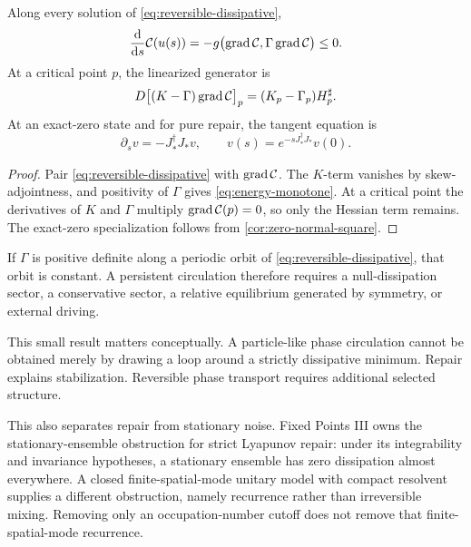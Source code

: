\documentclass[11pt,a4paper]{article}
\begin{document}
\begin{theorem}
\label{thm:repair-flow}
Along every solution of \eqref{eq:reversible-dissipative},
\begin{equation}
\frac{\mathrm{d}}{\mathrm{d} s}\mathcal{C}(u(s))
=-g\bigl(\operatorname{grad}\mathcal{C},\Gamma\operatorname{grad}\mathcal{C}\bigr)\leq0.
\label{eq:energy-monotone}
\end{equation}
At a critical point \(p\), the linearized generator is
\begin{equation}
D\bigl[(K-\Gamma)\operatorname{grad}\mathcal{C}\bigr]_p
=(K_p-\Gamma_p)H_p^{\sharp}.
\label{eq:linearized-general}
\end{equation}
At an exact-zero state and for pure repair, the tangent equation is
\begin{equation}
\partial_s v=-J_*^{\dagger}J_*v,
\qquad
v(s)=e^{-sJ_*^{\dagger}J_*}v(0).
\label{eq:tangent-heat}
\end{equation}
\end{theorem}

\begin{proof}
Pair \eqref{eq:reversible-dissipative} with \(\operatorname{grad}\mathcal{C}\).  The
\(K\)-term vanishes by skew-adjointness, and positivity of \(\Gamma\)
gives \eqref{eq:energy-monotone}.  At a critical point the derivatives of
\(K\) and \(\Gamma\) multiply \(\operatorname{grad}\mathcal{C}(p)=0\), so only the Hessian
term remains.  The exact-zero specialization follows from
\cref{cor:zero-normal-square}.
\end{proof}

\begin{corollary}
\label{cor:circulation-no-go}
If \(\Gamma\) is positive definite along a periodic orbit of
\eqref{eq:reversible-dissipative}, that orbit is constant.  A persistent
circulation therefore requires a null-dissipation sector, a conservative
sector, a relative equilibrium generated by symmetry, or external driving.
\end{corollary}

This small result matters conceptually.  A particle-like phase circulation
cannot be obtained merely by drawing a loop around a strictly dissipative
minimum.  Repair explains stabilization.  Reversible phase transport
requires additional selected structure.

This also separates repair from stationary noise. Fixed Points III owns
the stationary-ensemble obstruction for strict Lyapunov repair: under its
integrability and invariance hypotheses, a stationary ensemble has zero
dissipation almost everywhere. A closed finite-spatial-mode unitary model
with compact resolvent supplies a different obstruction, namely recurrence
rather than irreversible mixing. Removing only an occupation-number
cutoff does not remove that finite-spatial-mode recurrence.
\end{document}
